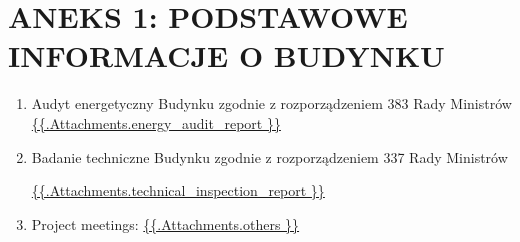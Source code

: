 \section{ANEKS 1: PODSTAWOWE INFORMACJE O BUDYNKU}

\begin{enumerate}[label=\arabic*.]
	\item Audyt energetyczny Budynku zgodnie z rozporządzeniem 383 Rady Ministrów
\url{ {{.Attachments.energy_audit_report }} }

\iffalse attachment value="energy audit report" \fi

	\item Badanie techniczne Budynku zgodnie z rozporządzeniem 337 Rady Ministrów

\url{ {{.Attachments.technical_inspection_report }} }

\iffalse attachment value="technical inspection report" \fi

	\item Project meetings:
          \url{ {{.Attachments.others }} }
          \iffalse attachment value="others" \fi

\end{enumerate}
